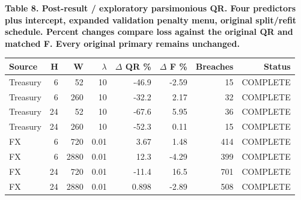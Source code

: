 \documentclass[10pt,a4paper]{article}
\begin{document}
\begin{center}
\begin{minipage}{\linewidth}
\small\textbf{Table 8. Post-result / exploratory parsimonious QR. Four predictors plus intercept, expanded validation penalty menu, original split/refit schedule. Percent changes compare loss against the original QR and matched F. Every original primary remains unchanged.}\par\medskip
\centering\fontsize{8}{10}\selectfont
\begin{tabular}{lrrrrrrr}
\toprule
Source & H & W & \(\lambda\) & \(\Delta\) QR \% & \(\Delta\) F \% & Breaches & Status \\
\midrule
Treasury & 6 & 52 & 10 & -46.9 & -2.59 & 15 & COMPLETE \\
Treasury & 6 & 260 & 10 & -32.2 & 2.17 & 32 & COMPLETE \\
Treasury & 24 & 52 & 10 & -67.6 & 5.95 & 36 & COMPLETE \\
Treasury & 24 & 260 & 10 & -52.3 & 0.11 & 15 & COMPLETE \\
FX & 6 & 720 & 0.01 & 3.67 & 1.48 & 414 & COMPLETE \\
FX & 6 & 2880 & 0.01 & 12.3 & -4.29 & 399 & COMPLETE \\
FX & 24 & 720 & 0.01 & -11.4 & 16.5 & 701 & COMPLETE \\
FX & 24 & 2880 & 0.01 & 0.898 & -2.89 & 508 & COMPLETE \\
\bottomrule
\end{tabular}
\end{minipage}
\end{center}
\end{document}
